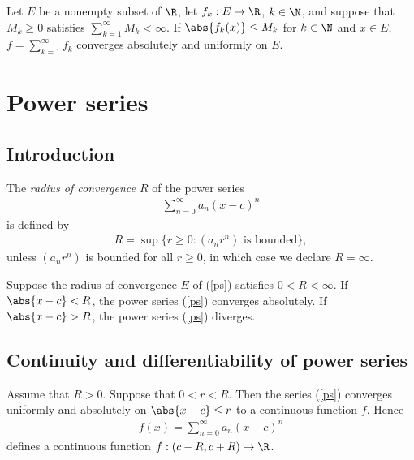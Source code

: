 \documentclass{article}
\begin{document}
\begin{theorem}
	Let $E$ be a nonempty subset of $\R$, let $f_k:E\to\R$, $k\in\N$, and suppose that $M_k\geq 0$
	satisfies $\sum_{k=1}^\infty M_k<\infty$. If $\abs{f_k(x)}\leq M_k$ for $k\in\N$ and $x\in E$,
	$f=\sum_{k=1}^\infty f_k$ converges absolutely and uniformly on $E$.
\end{theorem}

\section{Power series}

\subsection{Introduction}

\begin{definition}[Notes 3.1]
	The \emph{radius of convergence $R$} of the power series
	\begin{align}
		\label{ps}
		\sum_{n=0}^\infty a_n(x-c)^n
	\end{align}
	is defined by
	\begin{align*}
		R = \sup\{r\geq 0:(a_nr^n) \text{ is bounded}\},
	\end{align*}
	unless $(a_nr^n)$ is bounded for all $r\geq 0$, in which case we declare $R=\infty$.
\end{definition}

\begin{theorem}[Notes 3.1]
	Suppose the radius of convergence $E$ of (\ref{ps}) satisfies $0<R<\infty$.
	If $\abs{x-c}<R$, the power series (\ref{ps}) converges absolutely. If
	$\abs{x-c}>R$, the power series (\ref{ps}) diverges.
\end{theorem}

\subsection{Continuity and differentiability of power series}

\begin{theorem}[Notes 3.2]
	Assume that $R>0$. Suppose that $0<r<R$. Then the series (\ref{ps}) converges
	uniformly and absolutely on $\abs{x-c}\leq r$ to a continuous function $f$.
	Hence
	\begin{align*}
		f(x) = \sum_{n=0}^\infty a_n(x-c)^n
	\end{align*}
	defines a continuous function $f:(c-R, c+R)\to\R$.
\end{theorem}
\end{document}
